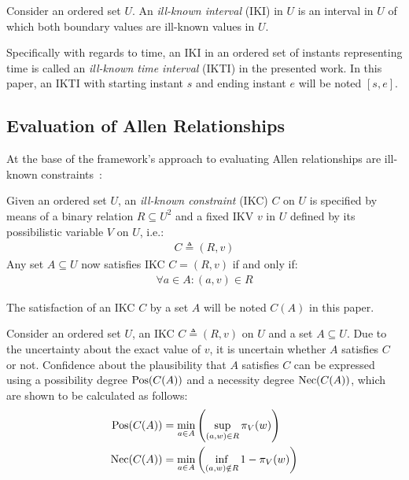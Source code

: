\begin{definition}
Consider an ordered set $U$. An \emph{ill-known interval} (IKI) in $U$ is an interval in $U$ of which both boundary values are ill-known values in $U$.
\end{definition}

Specifically with regards to time, an IKI in an ordered set of instants representing time is called an \emph{ill-known time interval} (IKTI) in the presented work. In this paper, an IKTI with starting instant $s$ and ending instant $e$ will be noted $\left[s, e\right]$.

\subsection{\label{subsec:ikc-evaluation}Evaluation of Allen Relationships}
At the base of the framework's approach to evaluating Allen relationships are ill-known constraints~\cite{Pons2011}:

\begin{definition}
Given an ordered set $U$, an \emph{ill-known constraint} (IKC) $C$ on $U$ is specified by means of a binary relation $R \subseteq U^{2}$ and a fixed IKV $v$ in $U$ defined by its possibilistic variable $V$ on $U$, i.e.:
\begin{align}
C \triangleq (R,v) \nonumber
\end{align}
Any set $A \subseteq U$ now satisfies IKC $C = (R,v)$ if and only if:
\vspace{-10pt}
\begin{align}
\forall a \in A : (a,v) \in R \nonumber
\end{align}
\end{definition}

The satisfaction of an IKC $C$ by a set $A$ will be noted $C(A)$ in this paper. 

Consider an ordered set $U$, an IKC $C \triangleq (R,v)$ on $U$ and a set $A \subseteq U$. Due to the uncertainty about the exact value of $v$, it is uncertain whether $A$ satisfies $C$ or not. Confidence about the plausibility that $A$ satisfies $C$ can be expressed using a possibility degree $\operatorname{Pos}(C(A))$ and a necessity degree $\operatorname{Nec}(C(A))$, which are shown to be calculated as follows:
\vspace{-5pt}
\begin{align}
\operatorname{Pos}(C(A)) & = \min_{a \in A}\left(\sup_{(a,w) \in R}\pi_{V}(w)\right) \label{ill-known-pos}\\
\operatorname{Nec}(C(A)) & = \min_{a \in A}\left(\inf_{(a,w) \notin R} 1-\pi_{V}(w)\right) \label{ill-known-nec}
\end{align}


